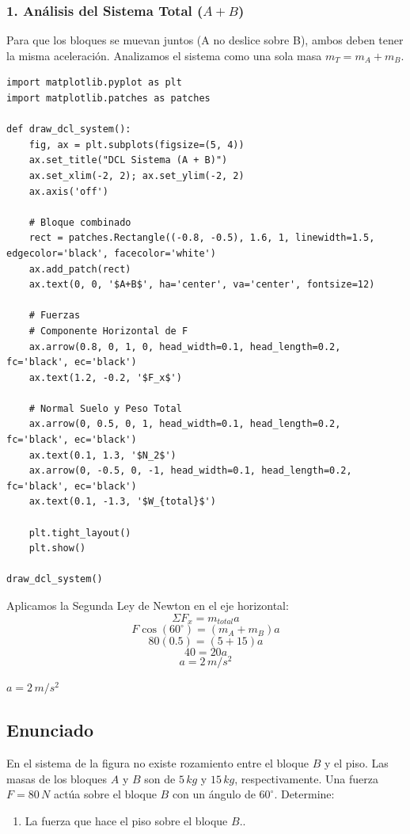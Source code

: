 \documentclass[12pt, a4paper]{article}
\begin{document}
\subsubsection*{1. Análisis del Sistema Total ($A+B$)}
Para que los bloques se muevan juntos (A no deslice sobre B), ambos deben tener la misma aceleración. Analizamos el sistema como una sola masa $m_T = m_A + m_B$.

\begin{lstlisting}
import matplotlib.pyplot as plt
import matplotlib.patches as patches

def draw_dcl_system():
    fig, ax = plt.subplots(figsize=(5, 4))
    ax.set_title("DCL Sistema (A + B)")
    ax.set_xlim(-2, 2); ax.set_ylim(-2, 2)
    ax.axis('off')
    
    # Bloque combinado
    rect = patches.Rectangle((-0.8, -0.5), 1.6, 1, linewidth=1.5, edgecolor='black', facecolor='white')
    ax.add_patch(rect)
    ax.text(0, 0, '$A+B$', ha='center', va='center', fontsize=12)
    
    # Fuerzas
    # Componente Horizontal de F
    ax.arrow(0.8, 0, 1, 0, head_width=0.1, head_length=0.2, fc='black', ec='black')
    ax.text(1.2, -0.2, '$F_x$')
    
    # Normal Suelo y Peso Total
    ax.arrow(0, 0.5, 0, 1, head_width=0.1, head_length=0.2, fc='black', ec='black')
    ax.text(0.1, 1.3, '$N_2$')
    ax.arrow(0, -0.5, 0, -1, head_width=0.1, head_length=0.2, fc='black', ec='black')
    ax.text(0.1, -1.3, '$W_{total}$')

    plt.tight_layout()
    plt.show()

draw_dcl_system()
\end{lstlisting}

Aplicamos la Segunda Ley de Newton en el eje horizontal:
$$ \Sigma F_x = m_{total} a $$
$$ F \cos(60^\circ) = (m_A + m_B) a $$
$$ 80 (0.5) = (5 + 15) a $$
$$ 40 = 20 a $$
$$ \boxed{a = 2 \, \si{m/s^2}} $$

\begin{tcolorbox}[colback=green!5!white, colframe=green!50!black, title=Respuesta Final]
\centering \Large $ a = 2 \, \si{m/s^2} $
\end{tcolorbox}

\newpage

\subsection*{Enunciado}
En el sistema de la figura no existe rozamiento entre el bloque $B$ y el piso. Las masas de los bloques $A$ y $B$ son de $5 \, \si{kg}$ y $15 \, \si{kg}$, respectivamente. Una fuerza $F = 80 \, \si{N}$ actúa sobre el bloque $B$ con un ángulo de $60^\circ$. Determine:
\begin{enumerate}[label=\alph*)]
    \item La fuerza que hace el piso sobre el bloque $B$..
\end{enumerate}
\end{document}
